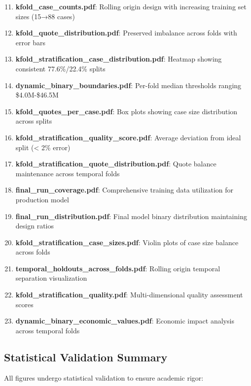 \documentclass[11pt,a4paper]{article}
\begin{document}
\begin{enumerate}
\setcounter{enumi}{10}
\item \textbf{kfold\_case\_counts.pdf}: Rolling origin design with increasing training set sizes (15→88 cases)
\item \textbf{kfold\_quote\_distribution.pdf}: Preserved imbalance across folds with error bars
\item \textbf{kfold\_stratification\_case\_distribution.pdf}: Heatmap showing consistent 77.6\%/22.4\% splits
\item \textbf{dynamic\_binary\_boundaries.pdf}: Per-fold median thresholds ranging \$4.0M-\$46.5M
\item \textbf{kfold\_quotes\_per\_case.pdf}: Box plots showing case size distribution across splits
\item \textbf{kfold\_stratification\_quality\_score.pdf}: Average deviation from ideal split (< 2\% error)
\item \textbf{kfold\_stratification\_quote\_distribution.pdf}: Quote balance maintenance across temporal folds
\item \textbf{final\_run\_coverage.pdf}: Comprehensive training data utilization for production model
\item \textbf{final\_run\_distribution.pdf}: Final model binary distribution maintaining design ratios
\item \textbf{kfold\_stratification\_case\_sizes.pdf}: Violin plots of case size balance across folds
\item \textbf{temporal\_holdouts\_across\_folds.pdf}: Rolling origin temporal separation visualization
\item \textbf{kfold\_stratification\_quality.pdf}: Multi-dimensional quality assessment scores
\item \textbf{dynamic\_binary\_economic\_values.pdf}: Economic impact analysis across temporal folds
\end{enumerate}

\subsection{Statistical Validation Summary}

All figures undergo statistical validation to ensure academic rigor:
\end{document}
